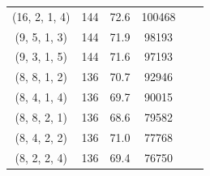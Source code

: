 \begin{table}[!t]
{\begin{tabular}{@{}cccccc@{}}
            (16, 2, 1, 4) & 144 & 72.6 & 100468 \\
            (9, 5, 1, 3)  & 144 & 71.9 & 98193 \\
            (9, 3, 1, 5)  & 144 & 71.6 & 97193 \\
            (8, 8, 1, 2)  & 136 & 70.7 & 92946 \\
            (8, 4, 1, 4)  & 136 & 69.7 & 90015 \\
            (8, 8, 2, 1)  & 136 & 68.6 & 79582 \\
            (8, 4, 2, 2)  & 136 & 71.0 & 77768 \\
            (8, 2, 2, 4)  & 136 & 69.4 & 76750 \\
            \bottomrule[1.2pt]
        \end{tabular}
    }
\end{table}

